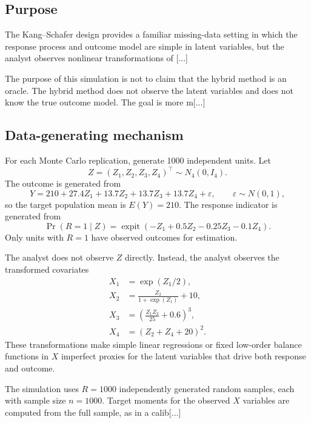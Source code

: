 \documentclass[11pt]{article}
\begin{document}
{\subsection{Purpose}

The Kang--Schafer design provides a familiar missing-data setting in which the response process and outcome model are simple in latent variables, but the analyst observes nonlinear transformations of [...]

The purpose of this simulation is not to claim that the hybrid method is an oracle. The hybrid method does not observe the latent variables and does not know the true outcome model. The goal is more m[...] 

\subsection{Data-generating mechanism}

For each Monte Carlo replication, generate 1000 independent units. Let
\begin{equation*}
Z=(Z_1,Z_2,Z_3,Z_4)^\top\sim N_4(0,I_4).
\end{equation*}
The outcome is generated from
\begin{equation*}
Y=210+27.4Z_1+13.7Z_2+13.7Z_3+13.7Z_4+\varepsilon,
\qquad
\varepsilon\sim N(0,1),
\end{equation*}
so the target population mean is $E(Y)=210$. The response indicator is generated from
\begin{equation*}
\Pr(R=1\mid Z)=\operatorname{expit}(-Z_1+0.5Z_2-0.25Z_3-0.1Z_4).
\end{equation*}
Only units with $R=1$ have observed outcomes for estimation.

The analyst does not observe $Z$ directly. Instead, the analyst observes the transformed covariates
\begin{align*}
X_1&=\exp(Z_1/2),\\
X_2&=\frac{Z_2}{1+\exp(Z_1)}+10,\\
X_3&=\left(\frac{Z_1Z_3}{25}+0.6\right)^3,\\
X_4&=(Z_2+Z_4+20)^2.
\end{align*}
These transformations make simple linear regressions or fixed low-order balance functions in $X$ imperfect proxies for the latent variables that drive both response and outcome.

The simulation uses $R=1000$ independently generated random samples, each with sample size $n=1000$. Target moments for the observed $X$ variables are computed from the full sample, as in a calib[...]

}
\end{document}
